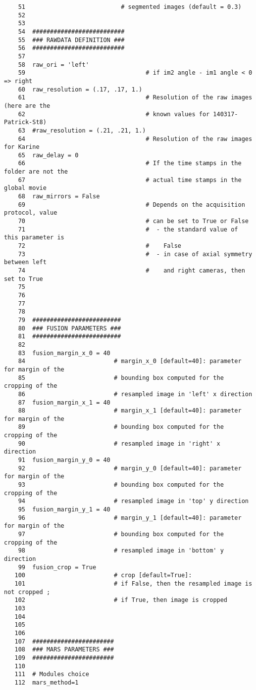 \begin{verbatim}
    51							 # segmented images (default = 0.3)
    52	
    53	
    54	##########################
    55	### RAWDATA DEFINITION ###
    56	##########################
    57	
    58	raw_ori = 'left' 				
    59	                                # if im2 angle - im1 angle < 0 => right
    60	raw_resolution = (.17, .17, 1.) 
    61	                                # Resolution of the raw images (here are the 
    62									# known values for 140317-Patrick-St8)
    63	#raw_resolution = (.21, .21, 1.) 
    64	                                # Resolution of the raw images for Karine
    65	raw_delay = 0 					
    66	                                # If the time stamps in the folder are not the
    67									# actual time stamps in the global movie
    68	raw_mirrors = False  			
    69	                                # Depends on the acquisition protocol, value 
    70									# can be set to True or False
    71									#  - the standard value of this parameter is 
    72									#    False
    73									#  - in case of axial symmetry between left 
    74									#    and right cameras, then set to True
    75	
    76	
    77	
    78	
    79	#########################
    80	### FUSION PARAMETERS ###
    81	#########################
    82	
    83	fusion_margin_x_0 = 40 
    84	                       # margin_x_0 [default=40]: parameter for margin of the
    85						   # bounding box computed for the cropping of the 
    86						   # resampled image in 'left' x direction 
    87	fusion_margin_x_1 = 40 
    88	                       # margin_x_1 [default=40]: parameter for margin of the
    89					       # bounding box computed for the cropping of the 
    90					       # resampled image in 'right' x direction
    91	fusion_margin_y_0 = 40 
    92	                       # margin_y_0 [default=40]: parameter for margin of the
    93						   # bounding box computed for the cropping of the 
    94						   # resampled image in 'top' y direction
    95	fusion_margin_y_1 = 40 
    96	                       # margin_y_1 [default=40]: parameter for margin of the
    97						   # bounding box computed for the cropping of the 
    98						   # resampled image in 'bottom' y direction
    99	fusion_crop = True     
   100	                       # crop [default=True]: 
   101	                       # if False, then the resampled image is not cropped ; 
   102						   # if True, then image is cropped
   103	
   104	
   105	
   106	
   107	#######################
   108	### MARS PARAMETERS ###
   109	#######################
   110	
   111	# Modules choice
   112	mars_method=1 			

\end{verbatim}
